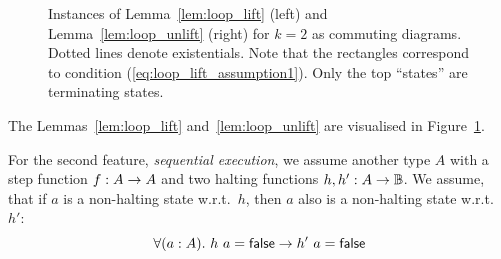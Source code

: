 \begin{figure}
  \center
  \hspace{1cm}
  \caption{Instances of Lemma~\ref{lem:loop_lift} (left) and Lemma~\ref{lem:loop_unlift} (right) for $k=2$ as commuting diagrams.  Dotted lines denote
    existentials.  Note that the rectangles correspond to condition (\ref{eq:loop_lift_assumption1}).  Only the top ``states'' are terminating
    states.}
  \label{fig:loop_lift_lemmas}
\end{figure}

The Lemmas~\ref{lem:loop_lift} and~\ref{lem:loop_unlift} are visualised in Figure~\ref{fig:loop_lift_lemmas}.

For the second feature, \textit{sequential execution}, we assume another type $A$ with a step function $f : A \rightarrow A$ and two halting functions
$h, h' : A \rightarrow \mathbb{B}$.  We assume, that if $a$ is a non-halting state w.r.t.\ $h$, then $a$ also is a non-halting state w.r.t.\ $h'$:
\begin{equation}
  \label{eq:loop_merge_assumption}
  \forall(a:A).~h~a = \mathsf{false} \rightarrow h'~a = \mathsf{false}
\end{equation}

